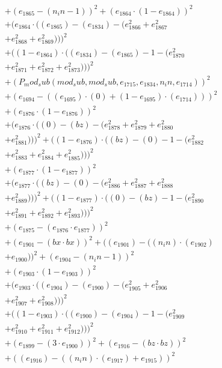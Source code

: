 \documentclass[10pt, a4paper]{article}
\begin{document}
\begin{small}
\begin{align*}
& + (e_{1865} - (n_in - 1))^{2} + (e_{1864}  \cdot  (1 - e_{1864}))^{2} \\
& + (e_{1864}  \cdot  ((e_{1865}) - (e_{1834}) - (e_{1866}^{2} + e_{1867}^{2} \\
& + e_{1868}^{2} + e_{1869}^{2})))^{2} \\
& + ((1 - e_{1864})  \cdot  ((e_{1834}) - (e_{1865}) - 1 - (e_{1870}^{2} \\
& + e_{1871}^{2} + e_{1872}^{2} + e_{1873}^{2})))^{2} \\
& + (P_mod_sub(mod_sub, mod_sub, e_{1715}, e_{1834}, n_in, e_{1714}))^{2} \\
& + (e_{1694} - ((e_{1695})  \cdot  (0) + (1 - e_{1695})  \cdot  (e_{1714})))^{2} \\
& + (e_{1876}  \cdot  (1 - e_{1876}))^{2} \\
& + (e_{1876}  \cdot  ((0) - (bz) - (e_{1878}^{2} + e_{1879}^{2} + e_{1880}^{2} \\
& + e_{1881}^{2})))^{2} + ((1 - e_{1876})  \cdot  ((bz) - (0) - 1 - (e_{1882}^{2} \\
& + e_{1883}^{2} + e_{1884}^{2} + e_{1885}^{2})))^{2} \\
& + (e_{1877}  \cdot  (1 - e_{1877}))^{2} \\
& + (e_{1877}  \cdot  ((bz) - (0) - (e_{1886}^{2} + e_{1887}^{2} + e_{1888}^{2} \\
& + e_{1889}^{2})))^{2} + ((1 - e_{1877})  \cdot  ((0) - (bz) - 1 - (e_{1890}^{2} \\
& + e_{1891}^{2} + e_{1892}^{2} + e_{1893}^{2})))^{2} \\
& + (e_{1875} - (e_{1876}  \cdot  e_{1877}))^{2} \\
& + (e_{1901} - (bx  \cdot  bx))^{2} + ((e_{1901}) - ((n_in)  \cdot  (e_{1902}) \\
& + e_{1900}))^{2} + (e_{1904} - (n_in - 1))^{2} \\
& + (e_{1903}  \cdot  (1 - e_{1903}))^{2} \\
& + (e_{1903}  \cdot  ((e_{1904}) - (e_{1900}) - (e_{1905}^{2} + e_{1906}^{2} \\
& + e_{1907}^{2} + e_{1908}^{2})))^{2} \\
& + ((1 - e_{1903})  \cdot  ((e_{1900}) - (e_{1904}) - 1 - (e_{1909}^{2} \\
& + e_{1910}^{2} + e_{1911}^{2} + e_{1912}^{2})))^{2} \\
& + (e_{1899} - (3  \cdot  e_{1900}))^{2} + (e_{1916} - (bz  \cdot  bz))^{2} \\
& + ((e_{1916}) - ((n_in)  \cdot  (e_{1917}) + e_{1915}))^{2} \\

\end{align*}
\end{small}
\end{document}
